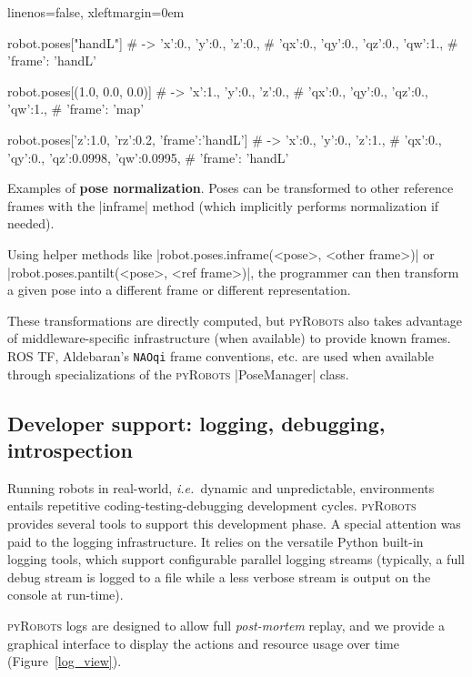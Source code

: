 \documentclass[a4paper, 10pt, conference]{ieeeconf}      %
\newcommand{\ie}{{\textit{i.e.\ }}}
\newcommand{\pyRobots}{\textsc{pyRobots}}
\begin{document}
\begin{listing}[H]
    \begin{pythoncode*}{linenos=false, xleftmargin=0em}

    robot.poses["handL"]
    # -> {'x':0., 'y':0., 'z':0., 
    #    'qx':0., 'qy':0., 'qz':0., 'qw':1., 
    #    'frame': 'handL'}

    robot.poses[(1.0, 0.0, 0.0)]
    # -> {'x':1., 'y':0., 'z':0., 
    #    'qx':0., 'qy':0., 'qz':0., 'qw':1., 
    #    'frame': 'map'}

    robot.poses[{'z':1.0, 'rz':0.2, 'frame':'handL'}]
    # -> {'x':0., 'y':0., 'z':1., 
    #    'qx':0., 'qy':0., 'qz':0.0998, 'qw':0.0995, 
    #    'frame': 'handL'}

\end{pythoncode*}
\caption{Examples of \textbf{pose normalization}. Poses can be transformed to
other reference frames with the \python|inframe| method (which implicitly performs
normalization if needed).}
\label{lst:poses}
\end{listing}

Using helper methods like \python|robot.poses.inframe(<pose>, <other frame>)| or
\python|robot.poses.pantilt(<pose>, <ref frame>)|, the programmer can then
transform a given pose into a different frame or different representation.

These transformations are directly computed, but \pyRobots{} also takes advantage
of middleware-specific infrastructure (when available) to provide known frames.
ROS TF, Aldebaran's {\tt NAOqi} frame conventions, etc. are used when available
through specializations of the \pyRobots{} \python|PoseManager| class.

\subsection{Developer support: logging, debugging, introspection}
\label{}

Running robots in real-world, \ie dynamic and unpredictable, environments
entails repetitive coding-testing-debugging development cycles. \pyRobots{}
provides several tools to support this development phase. A special attention
was paid to the logging infrastructure. It relies on the versatile Python
built-in logging tools, which support configurable parallel logging streams
(typically, a full debug stream is logged to a file while a less verbose stream
is output on the console at run-time).

\pyRobots{} logs are designed to allow full \emph{post-mortem} replay, and we
provide a graphical interface to display the actions and resource usage over
time (Figure~\ref{log_view}).
\end{document}
